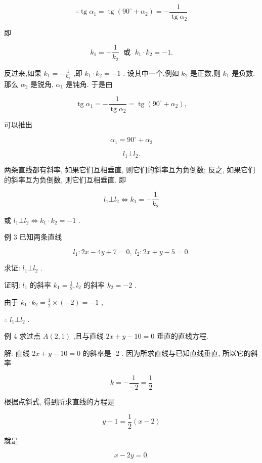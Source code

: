 \documentclass[lang=cn,newtx,10pt,scheme=chinese]{elegantbook}
\begin{document}
\[
  \therefore \operatorname{tg}{\alpha }_{1} = \operatorname{tg}\left( {{90}^{ \circ } + {\alpha }_{2}}\right) = - \frac{1}{\operatorname{tg}{\alpha }_{2}}
\]

即

\[
    {k}_{1} = - \frac{1}{{k}_{2}}\;\text{ 或 }\;{k}_{1} \cdot {k}_{2} = - 1.
\]

反过来,如果 \({k}_{1} = - \frac{1}{{k}_{2}}\) ,即 \({k}_{1} \cdot {k}_{2} = - 1\) . 设其中一个,例如 \({k}_{2}\) 是正数,则 \({k}_{1}\) 是负数. 那么 \({\alpha }_{2}\) 是锐角, \({\alpha }_{1}\) 是钝角. 于是由

\[
  \operatorname{tg}{\alpha }_{1} = - \frac{1}{\operatorname{tg}{\alpha }_{2}} = \operatorname{tg}\left( {{90}^{ \circ } + {\alpha }_{2}}\right) ,
\]

可以推出

\[
    {\alpha }_{1} = {90}^{ \circ } + {\alpha }_{2}
\]

\[
    {l}_{1} \bot {l}_{2}\text{.}
\]

两条直线都有斜率, 如果它们互相垂直, 则它们的斜率互为负倒数; 反之, 如果它们的斜率互为负倒数, 则它们互相垂直. 即

\[
    {l}_{1} \bot {l}_{2} \Leftrightarrow {k}_{1} = - \frac{1}{{k}_{2}}
\]

或 \({l}_{1} \bot {l}_{2} \Leftrightarrow {k}_{1} \cdot {k}_{2} = - 1\) .

例 3 已知两条直线

\[
    {l}_{1} : {2x} - {4y} + 7 = 0,\;{l}_{2} : {2x} + y - 5 = 0.
\]

求证: \({l}_{1} \bot {l}_{2}\) .

证明: \({l}_{1}\) 的斜率 \({k}_{1} = \frac{1}{2},{l}_{2}\) 的斜率 \({k}_{2} = - 2\) .

由于 \({k}_{1} \cdot {k}_{2} = \frac{1}{2} \times \left( {-2}\right) = - 1\) ,

\(\therefore \;{l}_{1} \bot {l}_{2}\) .

例 4 求过点 \(A\left( {2,1}\right)\) ,且与直线 \({2x} + y - {10} = 0\) 垂直的直线方程.

解: 直线 \({2x} + y - {10} = 0\) 的斜率是 -2 . 因为所求直线与已知直线垂直, 所以它的斜率

\[
  k = - \frac{1}{-2} = \frac{1}{2}
\]

根据点斜式, 得到所求直线的方程是

\[
  y - 1 = \frac{1}{2}\left( {x - 2}\right)
\]

就是

\[
  x - {2y} = 0.
\]
\end{document}
